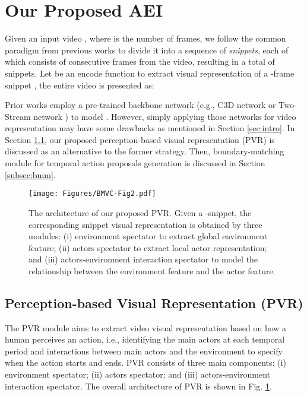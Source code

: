 \documentclass{bmvc2k}
\begin{document}
\section{Our Proposed AEI}


Given an input video , where  is the number of frames, we follow the common paradigm from previous works to divide it into a sequence of \textit{snippets}, each of which consists of  consecutive frames from the video, resulting in a total of  snippets. Let  be an encode function to extract visual representation of a -frame snippet , the entire video is presented as:




Prior works \cite{bmn, lin2018bsn, xu2020gtad} employ a pre-trained backbone network (e.g., C3D network \cite{C3D} or Two-Stream network \cite{2_stream_1}) to model .
However, simply applying those networks for video representation may have some drawbacks as mentioned in Section \ref{sec:intro}. In Section \ref{subsec:pvr}, our proposed perception-based visual representation (PVR) is discussed as an alternative to the former strategy. Then, boundary-matching module for temporal action proposals generation is discussed in Section \ref{subsec:bmm}. 







\begin{figure}[t]
\centering
  \texttt{[image: Figures/BMVC-Fig2.pdf]}
  \vspace*{0.2cm}
  \caption{The architecture of our proposed PVR. Given a -snippet, the corresponding snippet visual representation is obtained by three modules: (i) environment spectator to extract global environment feature; (ii) actors spectator to extract local actor representation; and (iii) actors-environment interaction spectator to model the relationship between the environment feature and the actor feature.}
  \vspace*{-0.4cm}
  \label{video_representation}
\end{figure}

\subsection{Perception-based Visual Representation (PVR)}
\label{subsec:pvr}
The PVR module aims to extract video visual representation based on how a human perceives an action, i.e., identifying the main actors at each temporal period and interactions between main actors and the environment to specify when the action starts and ends. PVR consists of three main components: (i) environment spectator; (ii) actors spectator; and (iii) actors-environment interaction spectator. The overall architecture of PVR is shown in Fig. \ref{video_representation}.
\end{document}
